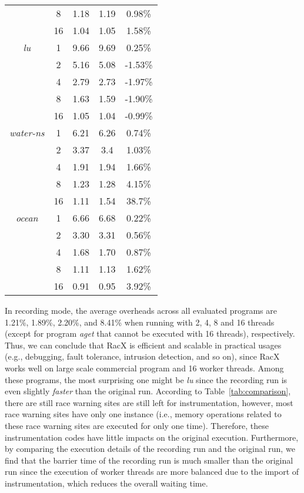 \documentclass[10pt,onecolumn,letterpaper]{article}
\begin{document}
\begin{table}
{\begin{tabular}{|c|c|c|c|c|}
\cline{2-5}  &8&1.18&1.19&0.98\%\\
\cline{2-5}  &16&1.04&1.05&1.58\%\\
\hline \hline \emph{lu}&1&9.66&9.69&0.25\%\\
\cline{2-5}  &2&5.16&5.08&-1.53\%\\
\cline{2-5}  &4&2.79&2.73&-1.97\%\\
\cline{2-5}  &8&1.63&1.59&-1.90\%\\
\cline{2-5}  &16&1.05&1.04&-0.99\%\\
\hline \hline \emph{water-ns}&1&6.21&6.26&0.74\%\\
\cline{2-5}  &2&3.37&3.4&1.03\%\\
\cline{2-5}  &4&1.91&1.94&1.66\%\\
\cline{2-5}  &8&1.23&1.28&4.15\%\\
\cline{2-5}  &16&1.11&1.54&38.7\%\\
\hline \hline \emph{ocean}&1&6.66&6.68&0.22\%\\
\cline{2-5}  &2&3.30&3.31&0.56\%\\
\cline{2-5}  &4&1.68&1.70&0.87\%\\
\cline{2-5}  &8&1.11&1.13&1.62\%\\
\cline{2-5}  &16&0.91&0.95&3.92\%\\
\hline
\end{tabular}}
\end{table}

In recording mode, the average overheads across all evaluated
programs are 1.21\%, 1.89\%, 2.20\%, and 8.41\% when running with 2,
4, 8 and 16 threads (except for program \emph{aget} that cannot be
executed with 16 threads), respectively. Thus, we can conclude that
RacX is efficient and scalable in practical usages (e.g., debugging,
fault tolerance, intrusion detection, and so on), since RacX works
well on large scale commercial program and 16 worker threads. Among
these programs, the most surprising one might be \emph{lu} since the
recording run is even slightly \emph{faster} than the original run.
According to Table~\ref{tab:comparison}, there are still  race
warning sites are still left for instrumentation, however, most race
warning sites have only one instance (i.e., memory operations
related to these race warning sites are executed for only one time).
Therefore, these instrumentation codes have little impacts on the
original execution. Furthermore, by comparing the execution details
of the recording run and the original run, we find that the barrier
time of the recording run is much smaller than the original run
since the execution of worker threads are more balanced due to the
import of instrumentation, which reduces the overall waiting time.
\end{document}
